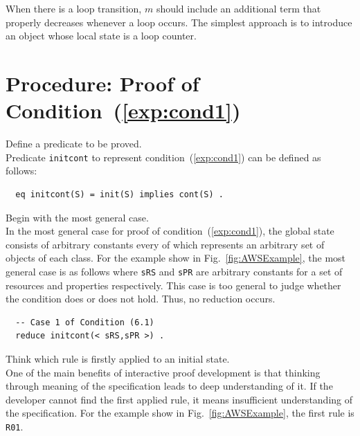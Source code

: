 \documentclass[12pt]{report}
\begin{document}
When there is a loop transition, $m$ should include an additional term
that properly decreases whenever a loop occurs. The simplest approach
is to introduce an object whose local state is a loop counter.

\section{Procedure: Proof of Condition~(\ref{exp:cond1})}
\label{sec:initcont}
 Define a predicate to be proved. \\
Predicate {\tt initcont} to represent condition~(\ref{exp:cond1}) can be defined as follows:
\begin{verbatim}
  eq initcont(S) = init(S) implies cont(S) .
\end{verbatim}
 Begin with the most general case. \\ In the
most general case for proof of condition~(\ref{exp:cond1}), the global state
consists of arbitrary constants every of which represents an arbitrary
set of objects of each class. For the example show in
Fig.~\ref{fig:AWSExample}, the most general case is as follows where
{\tt sRS} and {\tt sPR} are arbitrary constants for a set of resources
and properties respectively.  This case is too general to judge
whether the condition does or does not hold. Thus, no reduction
occurs.
\begin{verbatim}
  -- Case 1 of Condition (6.1)
  reduce initcont(< sRS,sPR >) .
\end{verbatim}

 Think which rule is firstly applied to an
initial state. \\ One of the main benefits of interactive proof
development is that thinking through meaning of the specification
leads to deep understanding of it. If the developer cannot find the
first applied rule, it means insufficient understanding of the
specification. For the example show in Fig.~\ref{fig:AWSExample}, the
first rule is {\tt R01}. \\
\end{document}
